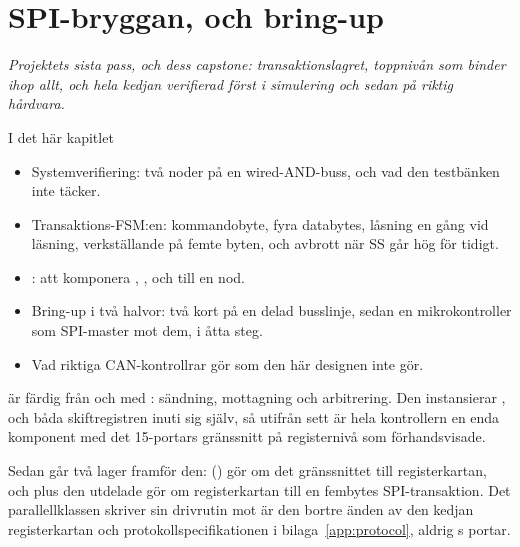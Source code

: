 
\chapter{SPI-bryggan,  och bring-up}
\label{c19:ch}

{\large\itshape Projektets sista pass, och dess capstone: transaktionslagret, toppnivån som binder
ihop allt, och hela kedjan verifierad först i simulering och sedan på riktig hårdvara.\par}

\begin{chapterbox}{I det här kapitlet}
\begin{itemize}
  \item Systemverifiering: två noder på en wired-AND-buss, och vad den testbänken inte täcker.
  \item Transaktions-FSM:en: kommandobyte, fyra databytes, låsning en gång vid läsning,
    verkställande på femte byten, och avbrott när SS går hög för tidigt.
  \item {}: att komponera , ,
     och  till en nod.
  \item Bring-up i två halvor: två kort på en delad busslinje, sedan en mikrokontroller som
    SPI-master mot dem, i åtta steg.
  \item Vad riktiga CAN-kontrollrar gör som den här designen inte gör.
\end{itemize}
\end{chapterbox}

 är färdig från och med : sändning, mottagning och arbitrering.
Den instansierar ,  och båda skiftregistren inuti sig själv, så utifrån
sett är hela kontrollern en enda komponent med det 15-portars gränssnitt på registernivå som
 förhandsvisade.

Sedan går två lager framför den:  () gör om det gränssnittet till
registerkartan, och  plus den utdelade  gör om registerkartan
till en fembytes SPI-transaktion. Det parallellklassen skriver sin drivrutin mot är den bortre änden
av den kedjan \textemdash{} registerkartan och protokollspecifikationen i bilaga~\ref{app:protocol},
aldrig s portar.

